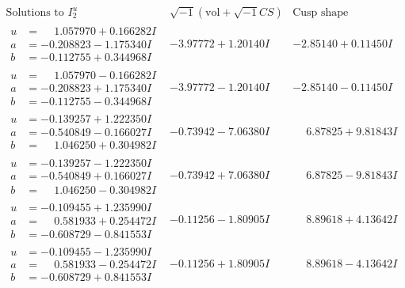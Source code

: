 \documentclass[1p]{elsarticle_modified}
\theoremstyle{definition}
\newcommand{\I}{\sqrt{-1}}
\begin{document}
$$\begin{array}{c|c|c}  
\text{Solutions to }I^u_{2}& \I (\text{vol} + \sqrt{-1}CS) & \text{Cusp shape}\\
 \hline 
\begin{aligned}
u &= \phantom{-}1.057970 + 0.166282 I \\
a &= -0.208823 - 1.175340 I \\
b &= -0.112755 + 0.344968 I\end{aligned}
 & -3.97772 + 1.20140 I & -2.85140 + 0.11450 I \\ \hline\begin{aligned}
u &= \phantom{-}1.057970 - 0.166282 I \\
a &= -0.208823 + 1.175340 I \\
b &= -0.112755 - 0.344968 I\end{aligned}
 & -3.97772 - 1.20140 I & -2.85140 - 0.11450 I \\ \hline\begin{aligned}
u &= -0.139257 + 1.222350 I \\
a &= -0.540849 - 0.166027 I \\
b &= \phantom{-}1.046250 + 0.304982 I\end{aligned}
 & -0.73942 - 7.06380 I & \phantom{-}6.87825 + 9.81843 I \\ \hline\begin{aligned}
u &= -0.139257 - 1.222350 I \\
a &= -0.540849 + 0.166027 I \\
b &= \phantom{-}1.046250 - 0.304982 I\end{aligned}
 & -0.73942 + 7.06380 I & \phantom{-}6.87825 - 9.81843 I \\ \hline\begin{aligned}
u &= -0.109455 + 1.235990 I \\
a &= \phantom{-}0.581933 + 0.254472 I \\
b &= -0.608729 - 0.841553 I\end{aligned}
 & -0.11256 - 1.80905 I & \phantom{-}8.89618 + 4.13642 I \\ \hline\begin{aligned}
u &= -0.109455 - 1.235990 I \\
a &= \phantom{-}0.581933 - 0.254472 I \\
b &= -0.608729 + 0.841553 I\end{aligned}
 & -0.11256 + 1.80905 I & \phantom{-}8.89618 - 4.13642 I \\ \hline\begin{aligned}

\end{aligned}
\end{array}$$
\end{document}
